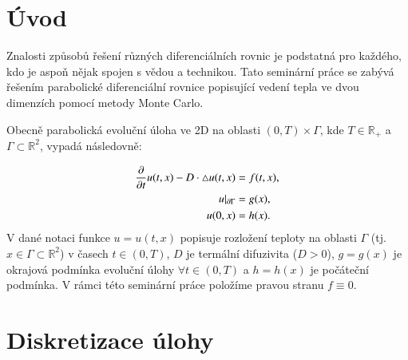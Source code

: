 \documentclass[11pt,american,czech]{article}
\newcommand*\Laplace{\mathop{}\!\mathbin\bigtriangleup}
\begin{document}
\begin{titlepage}
	
%	
	
	\vfill %
	
\end{titlepage}


\section{Úvod}\label{sec:1}

Znalosti způsobů řešení různých diferenciálních rovnic je podstatná pro každého, kdo je aspoň nějak spojen s vědou a technikou. Tato seminární práce se zabývá řešením parabolické diferenciální rovnice popisující vedení tepla ve dvou dimenzích pomocí metody Monte Carlo.

\medskip

Obecně parabolická evoluční úloha ve 2D  na oblasti $(0,T)\times\Gamma$, kde $T\in\mathbb{R}_{+}$ a $\Gamma\subset\mathbb{R}^{2}$, vypadá následovně:

\begin{equation} \label{ini_problem}
	\begin{split}
		\frac{\partial}{\partial t}u(t,x)-D\cdot\Laplace u(t,x)&=f(t,x) ,\\
		u\arrowvert_{\partial\Gamma}&=g(x),\\
		u(0,x)&=h(x).
	\end{split}
\end{equation}
\noindent 
V dané notaci funkce $u=u(t,x)$ popisuje rozložení teploty na oblasti $\Gamma$ (tj. $x\in\Gamma\subset\mathbb{R}^{2}$) v časech $t\in(0,T)$, $D$ je termální difuzivita ($D>0$), $g=g(x)$ je okrajová podmínka evoluční úlohy $\forall t\in(0,T)$ a $h=h(x)$ je počáteční podmínka. V rámci této seminární práce položíme pravou stranu $f\equiv 0$.

\section{Diskretizace úlohy}\label{sec:2}
\end{document}
